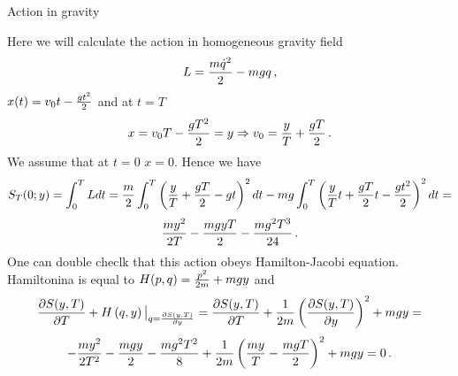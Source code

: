 



\baselineskip=14pt
\def\vare {\varepsilon}
\def\t {\tilde}
\def\a {\alpha}
\def\K {{\bf K}}
\def\N {{\bf N}}
\def\C {{\bf C}}
\def\L {{\cal L}}
\def\E {{\bf E}}
\def\s {{\sigma}}
\def\p{\partial}
\def\vare{{\varepsilon}}
\def\Q {{\bf Q}}
\def\D {{\cal D}}
\def\G {{\Gamma}}
\def\Z {{\bf Z}}
\def\R  {{\bf R}}
\def\l {\lambda}
\def\ll {{\bf l}}
\def\degree {{\bf {\rm degree}\,\,}}
\def \finish {${\,\,\vrule height1mm depth2mm width 8pt}$}
\def \m {\medskip}
\def\p {\partial}
\def\r {{\bf r}}
\def\pt {{\bf p}}
\def\v {{\bf v}}
\def\n {{\bf n}}
\def\t {{\bf t}}
\def\b {{\bf b}}
\def\c {{\bf c }}
\def\e{{\bf e}}
\def\f{{\bf f}}
\def\ac {{\bf a}}
\def \X   {{\bf X}}
\def \Y   {{\bf Y}}
\def \x   {{\bf x}}
\def \y   {{\bf y}}
\def\w {{\omega}}
\def \Tr  {{\rm Tr\,}}
\def\dim {{\rm dim\,\,}}
\def\t {{\tilde}} 
\def\dist {{\hbox{\tt "distance"}}}
\def  \dim {{\rm dim\,}}
\def  \Im  {{\rm Im\,}}
\def  \ker {{\rm ker\,}}


\def \Cl {\hbox{\tt Cliff}}

\centerline {Action in gravity}

   Here we will calculate the action in homogeneous gravity field
   $$
 L={m{\dot q}^2\over 2}-mgq\,,
  $$
 $x(t)=v_0t-{gt^2\over 2}$  and at $t=T$
         $$
x=v_0T-{gT^2\over 2}=y\Rightarrow v_0={y\over T}+{gT\over 2}\,.
         $$
We assume that at $t=0$  $x=0$.
  Hence we have
             $$
   S_T(0;y)=\int_0^T Ldt=
{m\over 2}\int_0^T 
\left({y\over T}+{gT\over 2}-gt\right)^2dt
                         -
               {mg}\int_0^T 
\left({y\over T}t+{gT\over 2}t-{gt^2\over 2}\right)^2dt=
             $$
     $$
{my^2\over 2T}-{mgyT\over 2}-{mg^2T^3\over 24}\,.
      $$
One can double checlk that this action 
obeys Hamilton-Jacobi equation.
Hamiltonina is equal to $H(p,q)={p^2\over 2m}+mgy$ and
                 $$
   {\p S(y,T)\over \p T}+H
              \left(
    q,y
          \right)\big\vert_
{q={\p S(y,T)\over \p y}}
           =
   {\p S(y,T)\over \p T}+
             {1\over 2m} 
            \left(
          {\p S(y,T)\over \p y}
             \right)^2+mgy=
        $$
     $$
-{my^2\over 2T^2}-{mgy\over 2}-{mg^2T^2\over 8}+
{1\over 2m}\left({my\over T}-{mgT\over 2}\right)^2
+mgy=0\,.
      $$
\def\S {{\cal S}}

